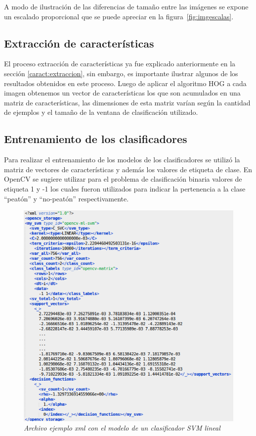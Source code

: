 A modo de ilustración de las diferencias de tamaño entre las imágenes se expone un escalado proporcional que se puede apreciar en la figura~\ref{fig:imgescalas}.

\subsection{Extracción de características}

El proceso extracción de características ya fue explicado anteriormente en la sección \ref{caract:extraccion}, sin embargo, es importante ilustrar algunos de los resultados obtenidos en este proceso. Luego de aplicar el algoritmo HOG a cada imagen obtenemos un vector de características los que son acumulados en una matriz de características, las dimensiones de esta matriz varían según la cantidad de ejemplos y el tamaño de la ventana de clasificación utilizado.

\subsection{Entrenamiento de los clasificadores}

Para realizar el entrenamiento de los modelos de los clasificadores se utilizó la matriz de vectores de características y además los valores de etiqueta de clase. En OpenCV se sugiere utilizar para el problema de clasificación binaria valores de etiqueta 1 y -1 los cuales fueron utilizados para indicar la pertenencia a la clase ``peatón'' y ``no-peatón'' respectivamente. 

\begin{figure}[htc]
  \centering
  \includegraphics[scale=.6]{images/modelo}
  \caption{\em Archivo ejemplo xml con el modelo de un clasificador SVM lineal }  
  \label{fig:ejmodelo}
\end{figure}

